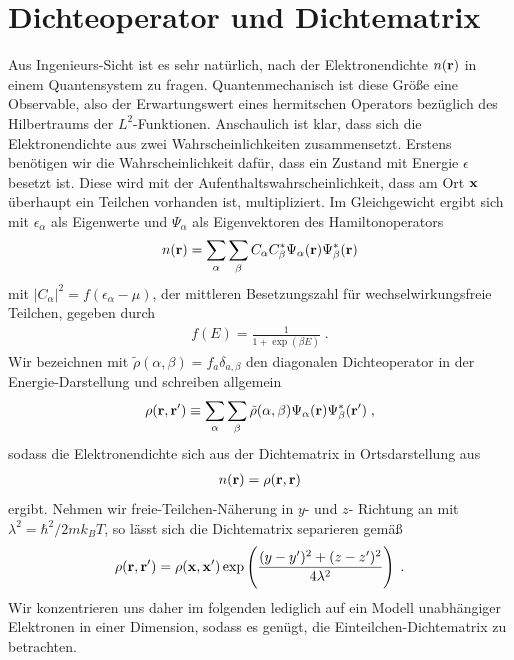 \section{Dichteoperator und Dichtematrix}
Aus Ingenieurs-Sicht ist es sehr natürlich, nach der Elektronendichte $n(\vb{r})$ in einem Quantensystem zu fragen. Quantenmechanisch ist diese Größe eine Observable, also der Erwartungswert eines hermitschen Operators bezüglich des Hilbertraums der $L^2$-Funktionen. Anschaulich ist klar, dass sich die Elektronendichte aus zwei Wahrscheinlichkeiten zusammensetzt. Erstens benötigen wir die Wahrscheinlichkeit dafür, dass ein Zustand mit Energie $\epsilon$ besetzt ist. Diese wird mit der  Aufenthaltswahrscheinlichkeit, dass am Ort $\vb{x}$ überhaupt ein Teilchen vorhanden ist, multipliziert. Im Gleichgewicht ergibt sich mit $\epsilon_{\alpha}$ als Eigenwerte und $\Psi_{\alpha}$ als Eigenvektoren des Hamiltonoperators \cite{datta}
\begin{align}
  n(\vb{r}) = \sum_{\alpha} \sum_{\beta} C_{\alpha} C_{\beta}^*\Psi_{\alpha}(\vb{r}) \Psi_{\beta}^*(\vb{r})
\end{align}
mit $|C_{\alpha}|^2 = f(\epsilon_{\alpha}-\mu)$, der mittleren Besetzungszahl für wechselwirkungsfreie Teilchen, gegeben durch
\begin{align}
  f(E) = \frac{1}{1+\exp(\beta E)} \; .
\end{align}
Wir bezeichnen mit $\tilde{\rho}(\alpha,\beta) = f_a\delta_{a,\beta}$ den diagonalen Dichteoperator in der Energie-Darstellung und schreiben allgemein
\begin{align}
  \rho(\vb{r},\vb{r}') \equiv \sum_{\alpha} \sum_{\beta} \tilde{\rho}(\alpha,\beta)\Psi_{\alpha}(\vb{r})\Psi^*_{\beta}(\vb{r}') \; ,
  \label{eq:unitTrafo}
\end{align}
sodass die Elektronendichte sich aus der Dichtematrix in Ortsdarstellung aus
\begin{align}
  n(\vb{r}) = \rho(\vb{r},\vb{r})
  \label{eq:dichteAusRho}
\end{align}
ergibt. Nehmen wir freie-Teilchen-Näherung in $y$- und $z$- Richtung an mit $\lambda^2 = \hbar^2/2mk_B T$, so lässt sich die Dichtematrix separieren \cite{grubin1993transport} gemäß
\begin{equation}
  \rho(\vb{r},\vb{r}') = \rho(\vb{x},\vb{x}') \exp\left( \frac{(y-y')^2 + (z-z')^2}{4\lambda^2}\right) \; .
\end{equation}
Wir konzentrieren uns daher im folgenden lediglich auf ein Modell unabhängiger Elektronen in einer Dimension, sodass es genügt, die Einteilchen-Dichtematrix zu betrachten.

